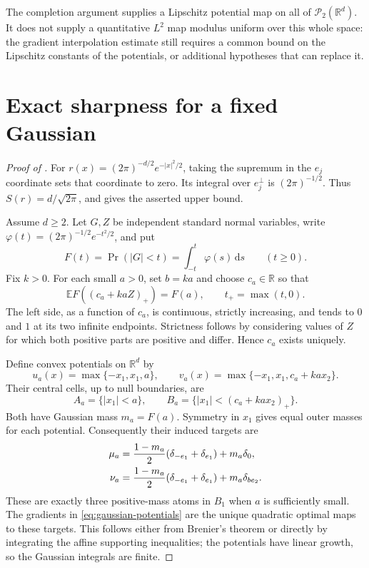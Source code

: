 \documentclass[11pt]{article}
\numberwithin{equation}{section}
\theoremstyle{remark}
\newcommand{\R}{\mathbb R}
\newcommand{\E}{\mathbb E}
\newcommand{\Prob}{\mathcal P}
\newcommand{\dd}{\,\mathrm d}
\begin{document}
The completion argument supplies a Lipschitz potential map on all of $\Prob_2(\R^d)$. It does not supply a quantitative $L^2$ map modulus uniform over this whole space: the gradient interpolation estimate still requires a common bound on the Lipschitz constants of the potentials, or additional hypotheses that can replace it.

\section{Exact sharpness for a fixed Gaussian}\label{sec:gaussian}
\begin{proof}[Proof of ]
For $r(x)=(2\pi)^{-d/2}e^{-|x|^2/2}$, taking the supremum in the $e_j$ coordinate sets that coordinate to zero. Its integral over $e_j^\perp$ is $(2\pi)^{-1/2}$. Thus $S(r)=d/\sqrt{2\pi}$, and  gives the asserted upper bound.

Assume $d\ge2$. Let $G,Z$ be independent standard normal variables, write $\varphi(t)=(2\pi)^{-1/2}e^{-t^2/2}$, and put
\[
 F(t)=\Pr(|G|<t)=\int_{-t}^t\varphi(s)\dd s\qquad(t\ge0).
\]
Fix $k>0$. For each small $a>0$, set $b=ka$ and choose $c_a\in\R$ so that
\begin{equation}\label{eq:ca-definition}
 \E F((c_a+kaZ)_+)=F(a),\qquad t_+=\max(t,0).
\end{equation}
The left side, as a function of $c_a$, is continuous, strictly increasing, and tends to $0$ and $1$ at its two infinite endpoints. Strictness follows by considering values of $Z$ for which both positive parts are positive and differ. Hence $c_a$ exists uniquely.

Define convex potentials on $\R^d$ by
\begin{equation}\label{eq:gaussian-potentials}
 u_a(x)=\max\{-x_1,x_1,a\},\qquad
 v_a(x)=\max\{-x_1,x_1,c_a+ka x_2\}.
\end{equation}
Their central cells, up to null boundaries, are
\[
 A_a=\{|x_1|<a\},\qquad
 B_a=\{|x_1|<(c_a+ka x_2)_+\}.
\]
Both have Gaussian mass $m_a=F(a)$. Symmetry in $x_1$ gives equal outer masses for each potential. Consequently their induced targets are
\begin{align}
 \mu_a&=\frac{1-m_a}{2}(\delta_{-e_1}+\delta_{e_1})+m_a\delta_0,\notag\\
 \nu_a&=\frac{1-m_a}{2}(\delta_{-e_1}+\delta_{e_1})+m_a\delta_{be_2}.
 \label{eq:gaussian-targets}
\end{align}
These are exactly three positive-mass atoms in $B_1$ when $a$ is sufficiently small. The gradients in \eqref{eq:gaussian-potentials} are the unique quadratic optimal maps to these targets. This follows either from Brenier's theorem or directly by integrating the affine supporting inequalities; the potentials have linear growth, so the Gaussian integrals are finite.


\end{proof}
\end{document}
